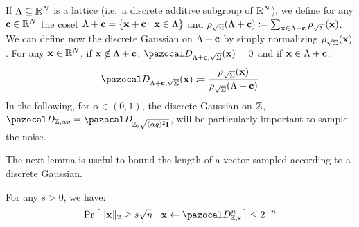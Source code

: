 {\begin{definition}
    If $\Lambda \subseteq \mathbb{R}^N$ is a lattice (i.e.\ a discrete additive subgroup of $\mathbb{R}^N$), we define for any $\mathbf{c} \in \mathbb{R}^N$ the coset $\Lambda + \mathbf{c} = \{\mathbf{x} +\mathbf{c} \mid \mathbf{x} \in \Lambda\}$ and $\rho_{\sqrt{\Sigma}}(\Lambda+\mathbf{c}) \coloneqq \sum_{\mathbf{x} \in \Lambda + \mathbf{c}} \rho_{\sqrt{\Sigma}}(\mathbf{x})$. We can define now the discrete Gaussian on $\Lambda + \mathbf{c}$ by simply normalizing $\rho_{\sqrt{\Sigma}}(\mathbf{x})$. For any $\mathbf{x} \in \mathbb{R}^N$, if $\mathbf{x} \notin \Lambda + \mathbf{c}$, $\cD_{\Lambda+\vect{c},\sqrt{\Sigma}}(\vect{x}) = 0$ and if $\mathbf{x} \in \Lambda + \mathbf{c}$:
    \begin{align}
      \cD_{\Lambda+\vect{c},\sqrt{\Sigma}}(\vect{x}) \eqdef \frac{\rho_{\sqrt{\Sigma}}(\vect{x})}{\rho_{\sqrt{\Sigma}}(\Lambda+\vect{c})}
    \end{align}
    In the following, for $\alpha \in (0,1)$, the discrete Gaussian on $\mathbb{Z}$, $\cD_{\Z, \alpha q} = \cD_{\Z, \sqrt{(\alpha q)^2 \vect{I}}}$, will be particularly important to sample the noise.
  \end{definition}

  The next lemma is useful to bound the length of a vector sampled according to a discrete Gaussian.
  \begin{lemmaE}\label{lem:boundGaussianDistrib}
    For any $s > 0$, we have:
    \begin{align}
      \pr{\|\vect{x}\|_2 \geq s \sqrt{n} \middle| \vect{x} \gets \disGaussCont{s}^n} \leq 2^{-n}
    \end{align}
  \end{lemmaE}
}

